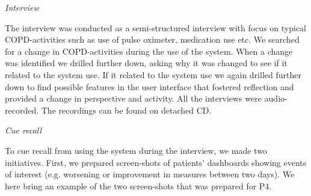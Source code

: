 \textit{Interview}

The interview was conducted as a semi-structured interview with focus on typical COPD-activities such as use of pulse oximeter, medication use etc. We searched for a change in COPD-activities during the use of the system. When a change was identified we drilled further down, asking why it was changed to see if it related to the system use. If it related to the system use we again drilled further down to find possible features in the user interface that fostered reflection and provided a change in perspective and activity. All the interviews were audio-recorded. The recordings can be found on detached CD.

\textit{Cue recall}

To cue recall from using the system during the interview, we made two initiatives. First, we prepared screen-shots of patients' dashboards showing events of interest (e.g. worsening or improvement in measures between two days). We here bring an example of the two screen-shots that was prepared for P4. 

